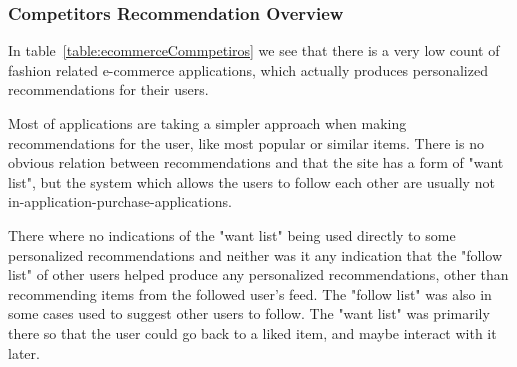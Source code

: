 \subsubsection{Competitors Recommendation Overview}
\label{par:competitors_recommendation_overview}

In table~\ref{table:ecommerceCommpetiros} we see that there is a very low count
of fashion related e-commerce applications, which actually produces
personalized recommendations for their users.

Most of applications are taking a simpler approach when making recommendations
for the user, like most popular or similar items.  There is no obvious relation
between recommendations and that the site has a form of "want list", but the
system which allows the users to follow each other are usually not
in-application-purchase-applications.

There where no indications of the "want list" being used directly to some
personalized recommendations and neither was it any indication that the "follow
list" of other users helped produce any personalized recommendations, other
than recommending items from the followed user's feed.  The "follow list" was
also in some cases used to suggest other users to follow.  The "want list" was
primarily there so that the user could go back to a liked item, and maybe
interact with it later.

